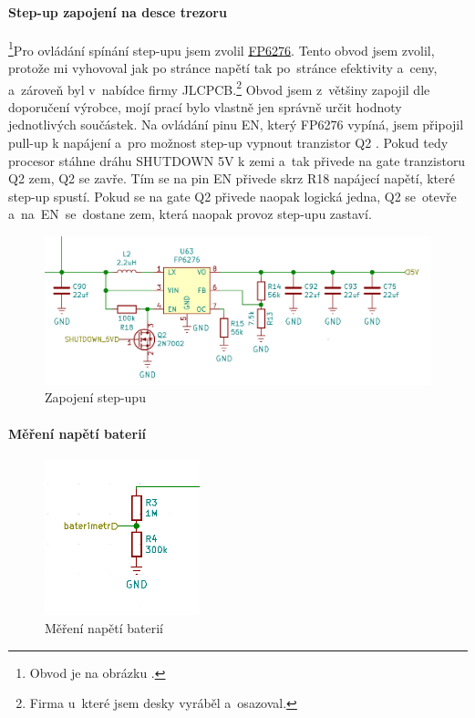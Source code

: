 \paragraph*{Step-up zapojení na desce trezoru}\footnote{Obvod je na obrázku .}Pro ovládání spínání step-upu jsem zvolil \href{https://datasheet.lcsc.com/szlcsc/Feeling-Tech-FP6276AXR-G1_C83308.pdf}{FP6276}.
Tento obvod jsem zvolil, protože mi vyhovoval jak po stránce napětí tak po~stránce efektivity a~ceny, a~zároveň byl v~nabídce firmy JLCPCB.\footnote{Firma u~které jsem desky vyráběl a~osazoval.}
Obvod jsem z~většiny zapojil dle doporučení výrobce, mojí prací bylo vlastně jen správně určit hodnoty 
jednotlivých součástek. Na ovládání pinu EN, který FP6276 vypíná, jsem připojil pull-up k napájení a~pro možnost step-up vypnout tranzistor Q2 \parencite{cj3134k}. 
Pokud tedy procesor stáhne dráhu SHUTDOWN 5V k zemi a~tak přivede na gate tranzistoru Q2 zem, 
Q2 se zavře. Tím se na pin EN přivede skrz R18 napájecí napětí, které step-up spustí. 
Pokud se na gate Q2 přivede naopak logická jedna, Q2 se~otevře a~na~EN~se~dostane zem, která naopak provoz step-upu zastaví.

\begin{figure}[htbp]
    \centering
    \includegraphics[width=400pt]{kapitoly/obrazky/E4/napajeni/step-up.png}
    \caption{Zapojení step-upu}
    \label{fig:E4-step-up}
\end{figure}

\paragraph*{Měření napětí baterií}

\begin{figure}
    \centering
    \includegraphics[width=0.4\textwidth]{kapitoly/obrazky/E4/napajeni/delic_baterimetru.png}
    \caption{Měření napětí baterií\label{fig:baterimetr} \centering}
\end{figure}

